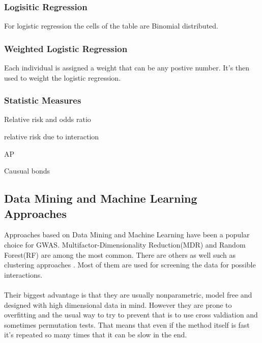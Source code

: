 \documentclass[10pt,a4paper]{article}
\begin{document}
\subsubsection{Logisitic Regression}
For logistic regression the cells of the table are Binomial distributed.\cite{agresti_categorical}

\subsubsection{Weighted Logistic Regression}
Each individual is assigned a weight that can be any postive number. It's then used to weight the logistic regression.

\subsubsection{Statistic Measures}

Relative risk and odds ratio\cite{agresti_categorical}

relative risk due to interaction

AP

Causual bonds\cite{causal_bounds_arvid}

\subsection{Data Mining and Machine Learning Approaches}
\label{data_machine_learning}
Approaches based on Data Mining and Machine Learning have been a popular choice for GWAS. Multifactor-Dimensionality Reduction(MDR)\cite{mdr_2001} and Random Forest(RF)\cite{random_forest} are among the most common\cite{gene_enviroment_2013,cordell_detect_review}. There are others as well such as clustering approaches \cite{fast_high_order_cluster}. Most of them are used for screening the data for possible interactions\cite{gene_enviroment_2013,cordell_detect_review}.\\
\\
Their biggest advantage is that they are usually nonparametric, model free and designed with high dimensional data in mind. However they are prone to overfitting and the usual way to try to prevent that is to use cross valdiation and sometimes permutation tests. That means that even if the method itself is fast it's repeated so many times that it can be slow in the end.\cite{cordell_detect_review}
\end{document}
